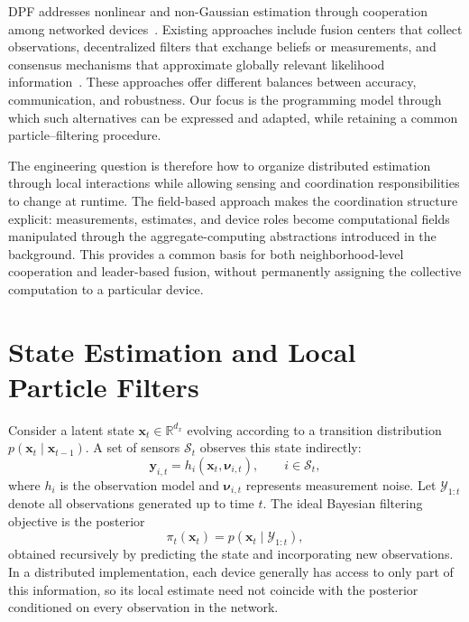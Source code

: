 \gls{DPF} addresses nonlinear and non-Gaussian estimation 
 through cooperation among networked devices~\cite{HlinkaHD13}.
%
Existing approaches include fusion centers that collect observations, 
 decentralized filters that exchange beliefs or measurements, 
 and consensus mechanisms that approximate globally relevant likelihood information~\cite{HlinkaSHDR12,HlinkaHD14}.
%
These approaches offer different balances between accuracy, 
 communication, and robustness.
%
Our focus is the programming model through which such alternatives can be expressed and adapted, 
 while retaining a common particle--filtering procedure.

The engineering question is therefore how to organize distributed estimation through local interactions 
 while allowing sensing and coordination responsibilities to change at runtime.
%
The field-based approach makes the coordination structure explicit: 
 measurements, estimates, and device roles become computational fields manipulated 
 through the aggregate-computing abstractions introduced in the background.
%
This provides a common basis for both neighborhood-level cooperation and leader-based fusion, 
 without permanently assigning the collective computation to a particular device.

\section{State Estimation and Local Particle Filters}
\label{sec:dpf-formalization}

Consider a latent state $\mathbf{x}_t \in \mathbb{R}^{d_x}$ evolving according 
 to a transition distribution $p(\mathbf{x}_t \mid \mathbf{x}_{t-1})$.
%
A set of sensors $\mathcal{S}_t$ observes this state indirectly:
\begin{equation}
    \mathbf{y}_{i,t} = h_i(\mathbf{x}_t,\boldsymbol{\nu}_{i,t}),
    \qquad i \in \mathcal{S}_t,
    \label{eq:dpf-observation}
\end{equation}
where $h_i$ is the observation model 
 and $\boldsymbol{\nu}_{i,t}$ represents measurement noise.
%
Let $\mathcal{Y}_{1:t}$ denote all observations generated up to time $t$.
%
The ideal Bayesian filtering objective is the posterior
\begin{equation}
    \pi_t(\mathbf{x}_t)
    = p(\mathbf{x}_t \mid \mathcal{Y}_{1:t}),
    \label{eq:dpf-posterior}
\end{equation}
obtained recursively by predicting the state and incorporating new observations.
%
In a distributed implementation, 
 each device generally has access to only part of this information, 
 so its local estimate need not coincide with the posterior conditioned 
 on every observation in the network.

